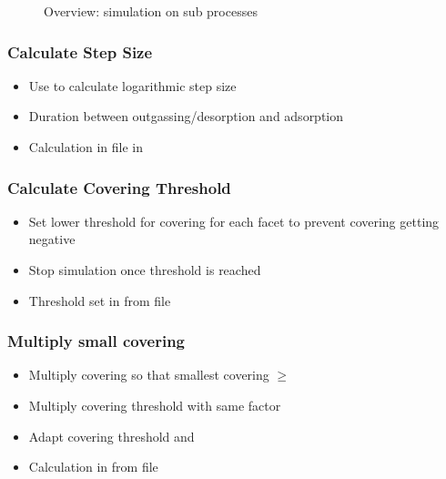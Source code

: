 \begin{figure}[!h]
\caption{Overview: simulation on sub processes}
\end{figure}

\subsubsection{Calculate Step Size}
\begin{itemize}[noitemsep,topsep=0pt, partopsep=0pt]
\item Use  to calculate logarithmic step size
\item Duration between outgassing/desorption and adsorption
\item Calculation in  file in 
\end{itemize}

\subsubsection{Calculate Covering Threshold}
\begin{itemize}[noitemsep,topsep=0pt, partopsep=0pt]
\item Set lower threshold for covering for each facet to prevent covering getting negative
\item Stop simulation once threshold is reached
\item Threshold set in   from  file
\end{itemize}

\subsubsection{Multiply small covering}
\begin{itemize}[noitemsep,topsep=0pt, partopsep=0pt]
\item Multiply covering so that smallest covering $\geq$ 
\item Multiply covering threshold with same factor
\item Adapt covering threshold and 
\item Calculation in  from  file
\end{itemize}

